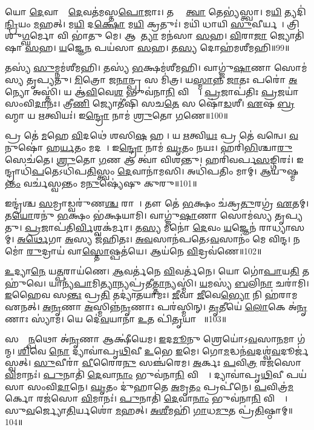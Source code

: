 𑌯𑍋 \ul{𑌦𑍇}𑌵𑌾𑌨𑌾𑌂᳚ \ul{𑌦𑍇}𑌵𑌤॑𑌮𑌸𑍍𑌤\ul{𑌪𑍋}𑌜𑌾𑌃।
𑌤𑌸𑍍𑌮𑍈᳚ \ul{𑌤𑍍𑌵𑌾} 𑌤𑍇𑌭𑍍𑌯॑𑌸𑍍𑌤𑍍𑌵𑌾।
𑌮\ul{𑌯𑌿} 𑌤𑍍𑌯𑌦𑌿॑\ul{𑌨𑍍𑌦𑍍𑌰𑌿}𑌯𑌂 \ul{𑌮}𑌹𑌤𑍍।
𑌮\ul{𑌯𑌿} 𑌦\ul{𑌕𑍍𑌷𑍋} 𑌮\ul{𑌯𑌿} 𑌕𑍍𑌰𑌤𑍁𑌃॑।
𑌮𑌯𑌿॑ 𑌧𑌾𑌯𑌿 \ul{𑌸𑍁}𑌵𑍀𑌰𑍍𑌯𑌮𑍍᳚।
𑌤𑍍𑌰𑌿𑌶𑍁॑\ul{𑌗𑍍𑌘}𑌰𑍍𑌮𑍋 𑌵𑌿 𑌭𑌾॑𑌤𑍁 𑌮𑍇।
𑌆𑌕𑍂᳚\ul{𑌤𑍍𑌯𑌾} 𑌮𑌨॑𑌸𑌾 \ul{𑌸}𑌹।
\ul{𑌵𑌿}𑌰𑌾\ul{𑌜𑌾} 𑌜𑍍𑌯𑍋𑌤𑌿॑𑌷𑌾 \ul{𑌸}𑌹।
\ul{𑌯}𑌜𑍍𑌞𑍇\ul{𑌨} 𑌪𑌯॑𑌸𑌾 \ul{𑌸}𑌹।
𑌤\ul{𑌸𑍍𑌯} 𑌦𑍋𑌹॑𑌮𑌶𑍀𑌮𑌹𑌿॥99॥

𑌤𑌸𑍍𑌯॑ \ul{𑌸𑍁}𑌮𑍍𑌨𑌮॑𑌶𑍀𑌮𑌹𑌿।
𑌤𑌸𑍍𑌯॑ \ul{𑌭}𑌕𑍍𑌷𑌮॑𑌶𑍀𑌮𑌹𑌿।
𑌵𑌾𑌗𑍍𑌜𑍁॑\ul{𑌷𑌾}𑌣𑌾 𑌸𑍋𑌮॑𑌸𑍍𑌯 𑌤𑍃𑌪𑍍𑌯𑌤𑍁।
\ul{𑌮𑌿}𑌤𑍍𑌰𑍋 𑌜\ul{𑌨𑌾}𑌨𑍍𑌪𑍍𑌰 𑌸 𑌮𑌿॑𑌤𑍍𑌰।
𑌯\ul{𑌸𑍍𑌮𑌾}𑌨𑍍𑌨 \ul{𑌜𑌾}𑌤𑌃 𑌪𑌰𑍋॑ \ul{𑌅}𑌨𑍍𑌯𑍋 𑌅𑌸𑍍𑌤𑌿॑।
𑌯 𑌆॑\ul{𑌵𑌿}𑌵𑍇\ul{𑌶} 𑌭𑍁𑌵॑𑌨𑌾\ul{𑌨𑌿} 𑌵𑌿𑌶𑍍𑌵𑌾᳚।
\ul{𑌪𑍍𑌰}𑌜𑌾𑌪॑𑌤𑌿𑌃 \ul{𑌪𑍍𑌰}𑌜𑌯𑌾॑ 𑌸𑌂𑌵𑌿\ul{𑌦𑌾}𑌨𑌃।
𑌤𑍍𑌰𑍀\ul{𑌣𑌿} 𑌜𑍍𑌯𑍋𑌤𑍀॑𑌷𑌿 𑌸𑌚\ul{𑌤𑍇} 𑌸 𑌷𑍋॑\ul{𑌡}𑌶𑍀।
\ul{𑌏}𑌷 \ul{𑌬𑍍𑌰}𑌹𑍍𑌮𑌾 𑌯 \ul{𑌋}𑌤𑍍𑌵𑌿𑌯𑌃॑।
𑌇\ul{𑌨𑍍𑌦𑍍𑌰𑍋} 𑌨𑌾𑌮॑ \ul{𑌶𑍍𑌰𑍁}𑌤𑍋 \ul{𑌗}𑌣𑍇॥100॥

𑌪𑍍𑌰 𑌤𑍇॑ \ul{𑌮}𑌹𑍇 \ul{𑌵𑌿}𑌦𑌥𑍇॑ 𑌶𑌸𑌿\ul{𑌷}\ul{} 𑌹𑌰𑍀᳚।
𑌯 \ul{𑌋}𑌤𑍍𑌵𑌿\ul{𑌯𑌃} 𑌪𑍍𑌰 𑌤𑍇॑ 𑌵𑌨𑍍𑌵𑍇।
\ul{𑌵}𑌨𑍁𑌷𑍋॑ 𑌹\ul{𑌰𑍍𑌯}𑌤𑌂 𑌮𑌦𑌮𑍍᳚।
𑌇\ul{𑌨𑍍𑌦𑍍𑌰𑍋} 𑌨𑌾𑌮॑ \ul{𑌘𑍃}𑌤𑌂 𑌨𑌯𑌃।
𑌹𑌰𑌿॑\ul{𑌭𑌿}𑌶𑍍𑌚𑌾\ul{𑌰𑍁} 𑌸𑍇𑌚॑𑌤𑍇।
\ul{𑌶𑍍𑌰𑍁}𑌤𑍋 \ul{𑌗}𑌣 𑌆 𑌤𑍍𑌵𑌾॑ 𑌵𑌿𑌶𑌨𑍍𑌤𑍁।
𑌹𑌰𑌿॑𑌵𑌰𑍍𑌪\ul{𑌸}𑌙𑍍𑌗𑌿𑌰𑌃॑।
𑌇𑌨𑍍𑌦𑍍𑌰𑌾𑌧𑌿॑\ul{𑌪}𑌤𑍇\-𑌽𑌧𑌿॑𑌪\ul{𑌤𑌿}𑌸𑍍𑌤𑍍𑌵𑌂 \ul{𑌦𑍇}𑌵𑌾𑌨𑌾॑𑌮𑌸𑌿।
𑌅𑌧𑌿॑𑌪𑌤𑌿𑌂 𑌮𑌾𑌮𑍍।
𑌆𑌯𑍁॑𑌷𑍍𑌮\ul{𑌨𑍍𑌤𑌂} 𑌵𑌰𑍍𑌚॑𑌸𑍍𑌵𑌨𑍍𑌤𑌂 𑌮\ul{𑌨𑍁}𑌷𑍍𑌯𑍇॑𑌷𑍁 𑌕𑍁𑌰𑍁॥101॥

𑌇𑌨𑍍𑌦𑍍𑌰॑𑌶𑍍𑌚 \ul{𑌸}𑌮𑍍𑌰𑌾𑌡𑍍𑌵𑌰𑍁॑𑌣\ul{𑌶𑍍𑌚} 𑌰𑌾𑌜𑌾᳚।
𑌤𑍗 𑌤𑍇॑ \ul{𑌭}𑌕𑍍𑌷𑌂 𑌚॑𑌕𑍍𑌰\ul{𑌤𑍁}𑌰𑌗𑍍𑌰॑ \ul{𑌏}𑌤𑌮𑍍।
𑌤\ul{𑌯𑍋}𑌰𑌨𑍁॑ \ul{𑌭}𑌕𑍍𑌷𑌂 𑌭॑𑌕𑍍𑌷𑌯𑌾𑌮𑌿।
𑌵𑌾𑌗𑍍𑌜𑍁॑\ul{𑌷𑌾}𑌣𑌾 𑌸𑍋𑌮॑𑌸𑍍𑌯 𑌤𑍃𑌪𑍍𑌯𑌤𑍁।
\ul{𑌪𑍍𑌰}𑌜𑌾𑌪॑𑌤𑌿\ul{𑌰𑍍𑌵𑌿}𑌶𑍍𑌵𑌕॑𑌰𑍍𑌮𑌾।
𑌤\ul{𑌸𑍍𑌯} 𑌮𑌨𑍋॑ \ul{𑌦𑍇}𑌵𑌂 \ul{𑌯}𑌜𑍍𑌞𑍇𑌨॑ 𑌰𑌾𑌧𑍍𑌯𑌾𑌸𑌮𑍍।
\ul{𑌅}\ul{𑌰𑍍𑌥𑍇}𑌗𑌾 \ul{𑌅}𑌸𑍍𑌯 𑌜॑𑌹𑌿𑌤𑌃।
\ul{𑌅}\ul{𑌵}𑌸𑌾𑌨॑𑌪𑌤𑍇\-𑌽\ul{𑌵}𑌸𑌾𑌨𑌂॑ 𑌮𑍇 𑌵𑌿𑌨𑍍𑌦।
𑌨𑌮𑍋॑ \ul{𑌰𑍁}𑌦𑍍𑌰𑌾𑌯॑ 𑌵𑌾\ul{𑌸𑍍𑌤𑍋}𑌷𑍍𑌪𑌤॑𑌯𑍇।
𑌆𑌯॑𑌨𑍇 \ul{𑌵𑌿}𑌦𑍍𑌰𑌵॑𑌣𑍇॥102॥

\ul{𑌉}𑌦𑍍𑌯𑌾\ul{𑌨𑍇} 𑌯\ul{𑌤𑍍𑌪}𑌰𑌾𑌯॑𑌣𑍇।
\ul{𑌆}𑌵𑌰𑍍𑌤॑𑌨𑍇 \ul{𑌵𑌿}𑌵𑌰𑍍𑌤॑𑌨𑍇।
𑌯𑍋 𑌗𑍋॑\ul{𑌪𑌾}𑌯\ul{𑌤𑌿} 𑌤 𑌹𑍁॑𑌵𑍇।
𑌯𑌾𑌨𑍍𑌯॑\ul{𑌪𑌾}𑌮𑌿\ul{𑌤𑍍𑌯𑌾}𑌨𑍍𑌯𑌪𑍍𑌰॑𑌤𑍀\ul{𑌤𑍍𑌤𑌾}𑌨𑍍𑌯𑌸𑍍𑌮𑌿॑।
\ul{𑌯}𑌮𑌸𑍍𑌯॑ \ul{𑌬}𑌲𑌿\ul{𑌨𑌾} 𑌚𑌰𑌾॑𑌮𑌿।
\ul{𑌇}𑌹𑍈𑌵 𑌸\ul{𑌨𑍍𑌤𑌃} 𑌪𑍍𑌰\ul{𑌤𑌿} 𑌤𑌦𑍍𑌯𑌾॑𑌤𑌯𑌾𑌮𑌃।
\ul{𑌜𑍀}𑌵𑌾 \ul{𑌜𑍀}𑌵𑍇\ul{𑌭𑍍𑌯𑍋} 𑌨𑌿 𑌹॑𑌰𑌾𑌮 𑌏𑌨𑌤𑍍।
\ul{𑌅}\ul{𑌨𑍃}𑌣𑌾 \ul{𑌅}𑌸𑍍𑌮𑌿𑌨𑍍𑌨॑\ul{𑌨𑍃}𑌣𑌾𑌃 𑌪𑌰॑𑌸𑍍𑌮𑌿𑌨𑍍।
\ul{𑌤𑍃}𑌤𑍀𑌯𑍇॑ \ul{𑌲𑍋}𑌕𑍇 𑌅॑\ul{𑌨𑍃}𑌣𑌾𑌃 𑌸𑍍𑌯𑌾॑𑌮।
𑌯𑍇 𑌦𑍇॑\ul{𑌵}𑌯𑌾𑌨𑌾॑ \ul{𑌉}𑌤 𑌪𑌿॑\ul{𑌤𑍃}𑌯𑌾𑌣𑌾𑌃᳚॥103॥

𑌸𑌰𑍍𑌵𑌾᳚\ul{𑌨𑍍𑌪}𑌥𑍋 𑌅॑\ul{𑌨𑍃}𑌣𑌾 𑌆𑌕𑍍𑌷𑍀॑𑌯𑍇𑌮।
\ul{𑌇}𑌦\ul{𑌮𑍂}𑌨𑍁 𑌶𑍍𑌰𑍇𑌯𑍋॑\-𑌽\ul{𑌵}𑌸𑌾\ul{𑌨}𑌮𑌾 𑌗॑𑌨𑍍𑌮।
\ul{𑌶𑌿}𑌵𑍇 \ul{𑌨𑍋} 𑌦𑍍𑌯𑌾𑌵𑌾॑𑌪𑍃\ul{𑌥𑌿}𑌵𑍀 \ul{𑌉}𑌭𑍇 \ul{𑌇}𑌮𑍇।
𑌗𑍋\ul{𑌮}𑌦𑍍𑌧𑌨॑\ul{𑌵}𑌦𑌶𑍍𑌵॑\ul{𑌵}𑌦𑍂𑌰𑍍𑌜॑𑌸𑍍𑌵𑌤𑍍।
\ul{𑌸𑍁}𑌵𑍀𑌰𑌾॑ \ul{𑌵𑍀}𑌰𑍈𑌰\ul{𑌨𑍁} 𑌸𑌞𑍍𑌚॑𑌰𑍇𑌮।
\ul{𑌅}𑌰𑍍𑌕𑌃 \ul{𑌪}𑌵𑌿\ul{𑌤𑍍𑌰}\ul{} 𑌰𑌜॑𑌸𑍋 \ul{𑌵𑌿}𑌮𑌾𑌨𑌃॑।
\ul{𑌪𑍁}𑌨𑌾𑌤𑌿॑ \ul{𑌦𑍇}𑌵𑌾\ul{𑌨𑌾𑌂} 𑌭𑍁𑌵॑𑌨𑌾\ul{𑌨𑌿} 𑌵𑌿𑌶𑍍𑌵𑌾᳚।
𑌦𑍍𑌯𑌾𑌵𑌾॑𑌪𑍃\ul{𑌥𑌿}𑌵𑍀 𑌪𑌯॑𑌸𑌾 𑌸𑌂𑌵𑌿\ul{𑌦𑌾}𑌨𑍇।
\ul{𑌘𑍃}𑌤𑌂 𑌦𑍁॑𑌹𑌾𑌤𑍇 \ul{𑌅}𑌮𑍃\ul{𑌤𑌂} 𑌪𑍍𑌰𑌪𑍀॑𑌨𑍇।
\ul{𑌪}𑌵𑌿𑌤𑍍𑌰॑\ul{𑌮}𑌰𑍍𑌕𑍋 𑌰𑌜॑𑌸𑍋 \ul{𑌵𑌿}𑌮𑌾𑌨𑌃॑।
\ul{𑌪𑍁}𑌨𑌾𑌤𑌿॑ \ul{𑌦𑍇}𑌵𑌾\ul{𑌨𑌾𑌂} 𑌭𑍁𑌵॑𑌨𑌾\ul{𑌨𑌿} 𑌵𑌿𑌶𑍍𑌵𑌾᳚।
𑌸𑍁\ul{𑌵}𑌰𑍍𑌜𑍍𑌯𑍋\ul{𑌤𑌿}𑌰𑍍𑌯𑌶𑍋॑ \ul{𑌮}𑌹𑌤𑍍।
\ul{𑌅}\ul{𑌶𑍀}𑌮𑌹𑌿॑ \ul{𑌗𑌾}𑌧\ul{𑌮𑍁}𑌤 𑌪𑍍𑌰॑\ul{𑌤𑌿}𑌷𑍍𑌠𑌾𑌮𑍍॥104॥\anuvakamend[\ul{𑌚𑌾}\ul{𑌤}\ul{𑌯}\ul{𑌤} \ul{𑌶𑍍𑌰𑍀}\ul{𑌣𑍀}\ul{𑌤𑌾}\ul{\dng{ꣳ}} \ul{𑌸}𑌤𑍍𑌯\ul{𑌮𑌾}𑌹𑍁𑌰॑𑌶𑍀𑌮𑌹𑌿 \ul{𑌗}𑌣𑍇 𑌕𑍁॑𑌰𑍁 \ul{𑌵𑌿}𑌦𑍍𑌰𑌵॑𑌣𑍇 𑌪𑌿\ul{𑌤𑍃}𑌯𑌾𑌣𑌾॑ \ul{𑌅}𑌰𑍍𑌕𑍋 𑌰𑌜॑𑌸𑍋 \ul{𑌵𑌿}𑌮𑌾\ul{𑌨}𑌸𑍍𑌤𑍍𑌰𑍀𑌣𑌿॑ 𑌚]

